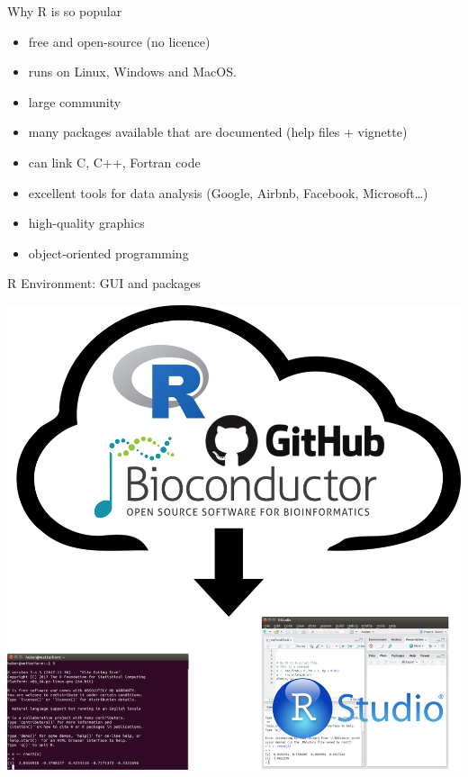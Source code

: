 \documentclass[9pt,ignorenonframetext,]{beamer}
\providecommand{\tightlist}{%
  \setlength{\itemsep}{0pt}\setlength{\parskip}{0pt}}
\begin{document}
\begin{frame}{Why R is so popular}

\begin{itemize}
\tightlist
\item
  free and open-source (no licence)
\item
  runs on Linux, Windows and MacOS.
\item
  large community
\item
  many packages available that are documented (help files + vignette)
\item
  can link C, C++, Fortran code
\item
  excellent tools for data analysis (Google, Airbnb, Facebook,
  Microsoft\ldots{})
\item
  high-quality graphics
\item
  object-oriented programming
\end{itemize}

\end{frame}

\begin{frame}{R Environment: GUI and packages}

\includegraphics{imgPres/packages.png}

\end{frame}
\end{document}
